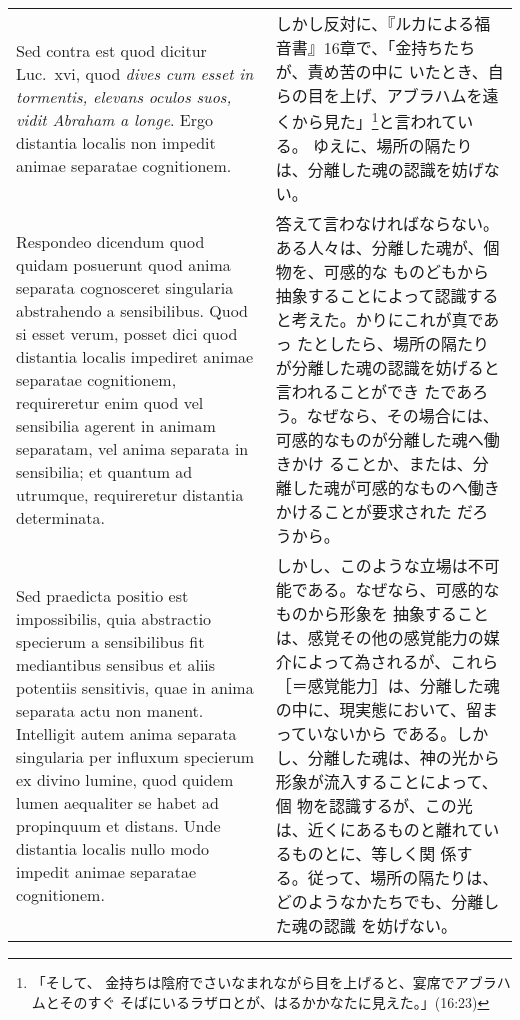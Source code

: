 \documentclass[10pt]{jsarticle} %
\begin{document}
\begin{longtable}{p{21em}p{21em}}
\\



{\sc Sed contra est} quod dicitur Luc.~{\sc xvi}, quod {\it dives cum
esset in tormentis, elevans oculos suos, vidit Abraham a longe}. Ergo
distantia localis non impedit animae separatae cognitionem.

&

しかし反対に、『ルカによる福音書』16章で、「金持ちたちが、責め苦の中に
いたとき、自らの目を上げ、アブラハムを遠くから見た」\footnote{「そして、
金持ちは陰府でさいなまれながら目を上げると、宴席でアブラハムとそのすぐ
そばにいるラザロとが、はるかかなたに見えた。」(16:23)}と言われている。
ゆえに、場所の隔たりは、分離した魂の認識を妨げない。

\\



{\sc Respondeo dicendum} quod quidam posuerunt quod anima separata
cognosceret singularia abstrahendo a sensibilibus. Quod si esset
verum, posset dici quod distantia localis impediret animae separatae
cognitionem, requireretur enim quod vel sensibilia agerent in animam
separatam, vel anima separata in sensibilia; et quantum ad utrumque,
requireretur distantia determinata.


&


答えて言わなければならない。ある人々は、分離した魂が、個物を、可感的な
ものどもから抽象することによって認識すると考えた。かりにこれが真であっ
たとしたら、場所の隔たりが分離した魂の認識を妨げると言われることができ
たであろう。なぜなら、その場合には、可感的なものが分離した魂へ働きかけ
ることか、または、分離した魂が可感的なものへ働きかけることが要求された
だろうから。


\\
Sed praedicta positio est impossibilis, quia abstractio specierum a
sensibilibus fit mediantibus sensibus et aliis potentiis sensitivis,
quae in anima separata actu non manent. Intelligit autem anima
separata singularia per influxum specierum ex divino lumine, quod
quidem lumen aequaliter se habet ad propinquum et distans. Unde
distantia localis nullo modo impedit animae separatae cognitionem.

&


しかし、このような立場は不可能である。なぜなら、可感的なものから形象を
抽象することは、感覚その他の感覚能力の媒介によって為されるが、これら
［＝感覚能力］は、分離した魂の中に、現実態において、留まっていないから
である。しかし、分離した魂は、神の光から形象が流入することによって、個
物を認識するが、この光は、近くにあるものと離れているものとに、等しく関
係する。従って、場所の隔たりは、どのようなかたちでも、分離した魂の認識
を妨げない。


\end{longtable}
\end{document}

